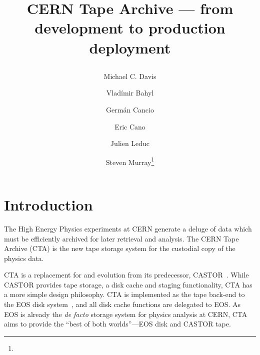 \documentclass{webofc}
\begin{document}
\title{\raggedright CERN Tape Archive --- from development to production \mbox{deployment}}
\author{Michael C. Davis
   \and Vlad\'imir Bahyl
   \and Germ\'an Cancio
   \and Eric Cano
   \and Julien Leduc
   \and Steven Murray\fnsep\thanks{}}


\maketitle

\section{Introduction}
\label{introduction}

The High Energy Physics experiments at CERN generate a deluge of data which must be efficiently archived
for later retrieval and analysis. The CERN Tape Archive (CTA) is the new tape storage system for the custodial
copy of the physics data.

CTA is a replacement for and evolution from its predecessor, CASTOR~\cite{castor2007}. While CASTOR provides tape
storage, a disk cache and staging functionality, CTA has a more simple design philosophy.
CTA is implemented as the tape back-end to the EOS disk system~\cite{eos_chep2015}, and all disk cache functions
are delegated to EOS. As EOS is already the \textit{de facto} storage system for physics analysis at CERN,
CTA aims to provide the ``best of both worlds''---EOS disk and CASTOR tape.
\end{document}
